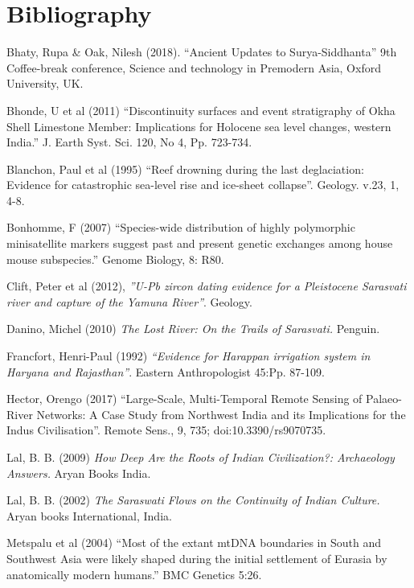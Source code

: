 \section*{Bibliography}

\begin{thebibliography}{99}
 Bhaty, Rupa \& Oak, Nilesh (2018). “Ancient Updates to Surya-Siddhanta” 9th Coffee-break conference, Science and technology in Premodern Asia, Oxford University, UK.

  Bhonde, U et al (2011) “Discontinuity surfaces and event stratigraphy of Okha Shell Limestone Member: Implications for Holocene sea level changes, western India.” J. Earth Syst. Sci. 120, No 4, Pp. 723-734.

  Blanchon, Paul et al (1995) “Reef drowning during the last deglaciation: Evidence for catastrophic sea-level rise and ice-sheet collapse”. Geology. v.23, 1, 4-8.

  Bonhomme, F (2007) “Species-wide distribution of highly polymorphic minisatellite markers suggest past and present genetic exchanges among house mouse subspecies.” Genome Biology, 8: R80.

  Clift, Peter et al (2012), \textit{”U-Pb zircon dating evidence for a Pleistocene Sarasvati river and capture of the Yamuna River”}. Geology.

  Danino, Michel (2010) \textit{The Lost River: On the Trails of Sarasvati.} Penguin.

  Francfort, Henri-Paul (1992) \textit{“Evidence for Harappan irrigation system in Haryana and Rajasthan”}. Eastern Anthropologist 45:Pp. 87-109.

  Hector, Orengo (2017) “Large-Scale, Multi-Temporal Remote Sensing of Palaeo-River Networks: A Case Study from Northwest India and its Implications for the Indus Civilisation”. Remote Sens., 9, 735; doi:10.3390/rs9070735.

  Lal, B. B. (2009) \textit{How Deep Are the Roots of Indian Civilization?: Archaeology Answers.} Aryan Books India.

  Lal, B. B. (2002) \textit{The Saraswati Flows on the Continuity of Indian Culture.} Aryan books International, India.

  Metspalu et al (2004) “Most of the extant mtDNA boundaries in South and Southwest Asia were likely shaped during the initial settlement of Eurasia by anatomically modern humans.” BMC Genetics 5:26.


\end{thebibliography}
